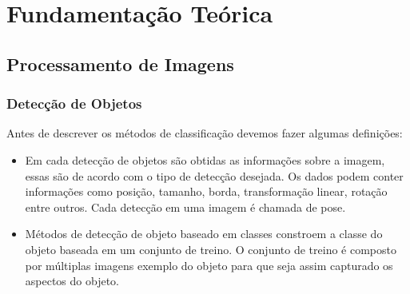 \graphicspath{{figuras/}}
\chapter{Fundamentação Teórica} \label{Cap:Fundamentacao}


\section{Processamento de Imagens}
\subsection{Detecção de Objetos}
\label{Sec:TiposDeDeteccaoDeObjetos}
Antes de descrever os métodos de classificação devemos fazer algumas definições:
\begin{itemize}
	\item	Em cada detecção de objetos são obtidas as informações sobre a imagem, essas são de acordo com o tipo de detecção desejada. Os dados podem conter informações como posição, tamanho, borda, transformação linear, rotação entre outros. Cada detecção em uma imagem é chamada de pose.
	
	\item	Métodos de detecção de objeto baseado em classes constroem a classe do objeto baseada em um conjunto de treino. O conjunto de treino é composto por múltiplas imagens exemplo do objeto para que seja assim capturado os aspectos do objeto.
\end{itemize}

